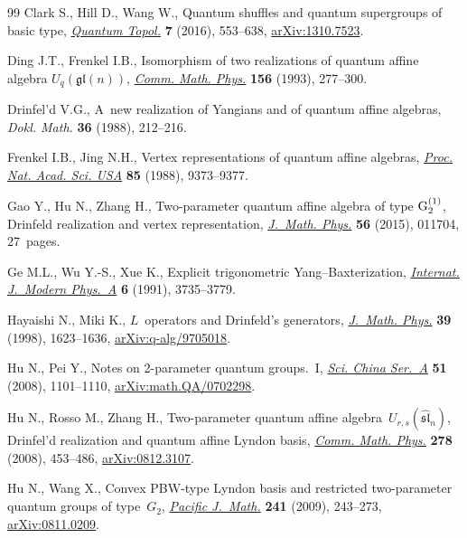 \documentclass[pdftex]{sigma}
\numberwithin{equation}{section}
\begin{document}
\begin{thebibliography}{99}
Clark S., Hill D., Wang W., Quantum shuffles and quantum supergroups of basic
 type, \href{https://doi.org/10.4171/QT/81}{\textit{Quantum Topol.}}
 \textbf{7} (2016), 553--638,
 \href{http://arxiv.org/abs/1310.7523}{arXiv:1310.7523}.

Ding J.T., Frenkel I.B., Isomorphism of two realizations of quantum affine
 algebra {$U_q(\mathfrak{gl}(n))$},
 \href{https://doi.org/10.1007/BF02098484}{\textit{Comm. Math. Phys.}}
 \textbf{156} (1993), 277--300.

Drinfel'd V.G., A~new realization of {Y}angians and of quantum affine algebras,
 \textit{Dokl. Math.} \textbf{36} (1988), 212--216.

Frenkel I.B., Jing N.H., Vertex representations of quantum affine algebras,
 \href{https://doi.org/10.1073/pnas.85.24.9373}{\textit{Proc. Nat. Acad. Sci.
 USA}} \textbf{85} (1988), 9373--9377.

Gao Y., Hu N., Zhang H., Two-parameter quantum affine algebra of type {${\rm
 G}_2^{(1)}$}, {D}rinfeld realization and vertex representation,
 \href{https://doi.org/10.1063/1.4905724}{\textit{J.~Math. Phys.}} \textbf{56}
 (2015), 011704, 27~pages.

Ge M.L., Wu Y.-S., Xue K., Explicit trigonometric {Y}ang--{B}axterization,
 \href{https://doi.org/10.1142/S0217751X91001817}{\textit{Internat. J.~Modern
 Phys.~A}} \textbf{6} (1991), 3735--3779.

Hayaishi N., Miki K., {$L$}~operators and {D}rinfeld's generators,
 \href{https://doi.org/10.1063/1.532398}{\textit{J.~Math. Phys.}} \textbf{39}
 (1998), 1623--1636,
 \href{http://arxiv.org/abs/q-alg/9705018}{arXiv:q-alg/9705018}.

Hu N., Pei Y., Notes on 2-parameter quantum groups.~{I},
 \href{https://doi.org/10.1007/s11425-008-0026-y}{\textit{Sci. China Ser.~A}}
 \textbf{51} (2008), 1101--1110,
 \href{http://arxiv.org/abs/math.QA/0702298}{arXiv:math.QA/0702298}.

Hu N., Rosso M., Zhang H., Two-parameter quantum affine
 algebra~{$U_{r,s}(\widehat{\mathfrak{sl}}_n)$}, {D}rinfel'd realization and
 quantum affine {L}yndon basis,
 \href{https://doi.org/10.1007/s00220-007-0405-1}{\textit{Comm. Math. Phys.}}
 \textbf{278} (2008), 453--486,
 \href{http://arxiv.org/abs/0812.3107}{arXiv:0812.3107}.

Hu N., Wang X., Convex {PBW}-type {L}yndon basis and restricted two-parameter
 quantum groups of type~{$G_2$},
 \href{https://doi.org/10.2140/pjm.2009.241.243}{\textit{Pacific J.~Math.}}
 \textbf{241} (2009), 243--273,
 \href{http://arxiv.org/abs/0811.0209}{arXiv:0811.0209}.


\end{thebibliography}
\end{document}
